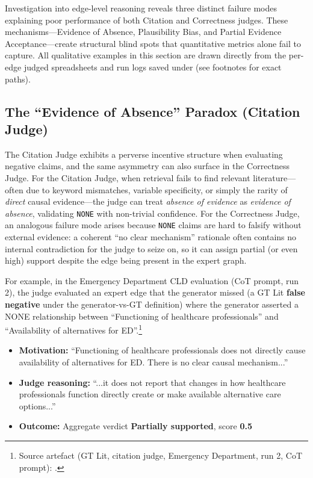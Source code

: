 Investigation into edge-level reasoning reveals three distinct failure modes explaining poor performance of both Citation and Correctness judges. These mechanisms---Evidence of Absence, Plausibility Bias, and Partial Evidence Acceptance---create structural blind spots that quantitative metrics alone fail to capture.
All qualitative examples in this section are drawn directly from the per-edge judged spreadsheets and run logs saved under \texttt{} (see footnotes for exact paths).

\subsection{The ``Evidence of Absence'' Paradox (Citation Judge)}

The Citation Judge exhibits a perverse incentive structure when evaluating negative claims, and the same asymmetry can also surface in the Correctness Judge. For the Citation Judge, when retrieval fails to find relevant literature---often due to keyword mismatches, variable specificity, or simply the rarity of \textit{direct} causal evidence---the judge can treat \textit{absence of evidence} as \textit{evidence of absence}, validating \texttt{NONE} with non-trivial confidence. For the Correctness Judge, an analogous failure mode arises because \texttt{NONE} claims are hard to falsify without external evidence: a coherent ``no clear mechanism'' rationale often contains no internal contradiction for the judge to seize on, so it can assign partial (or even high) support despite the edge being present in the expert graph.

For example, in the Emergency Department CLD evaluation (CoT prompt, run 2), the judge evaluated an expert edge that the generator missed (a GT Lit \textbf{false negative} under the generator-vs-GT definition) where the generator asserted a NONE relationship between ``Functioning of healthcare professionals'' and ``Availability of alternatives for ED''.\footnote{Source artefact (GT Lit, citation judge, Emergency Department, run 2, CoT prompt): .}%
\begin{itemize}[noitemsep]
    \item \textbf{Motivation:} ``Functioning of healthcare professionals does not directly cause availability of alternatives for ED. There is no clear causal mechanism...''
    \item \textbf{Judge reasoning:} ``...it does not report that changes in how healthcare professionals function directly create or make available alternative care options...''
    \item \textbf{Outcome:} Aggregate verdict \textbf{Partially supported}, score \textbf{0.5}
\end{itemize}

